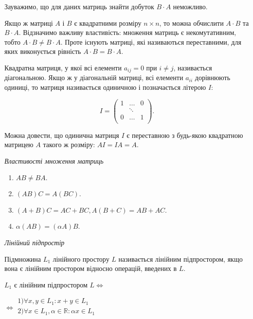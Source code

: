 Зауважимо, що для даних матриць знайти добуток $B \cdot A$ неможливо.

Якщо ж матриці $A$ і $B$ є квадратними розміру $n \times n$, то можна обчислити $A \cdot B$
та $B \cdot A$. Відзначимо важливу властивість: множення матриць є некомутативним,
тобто $A \cdot B \neq B \cdot A$. Проте існують матриці, які називаються переставними, для
яких виконується рівність $A \cdot B = B \cdot A$.

\begin{definition}
	Квадратна матриця, у якої всі елементи $a_{ij} = 0$ при $i \neq j$, називається
	діагональною. Якщо ж у діагональній матриці, всі елементи $a_{ii}$ дорівнюють
	одиниці, то матриця називається одиничною і позначається літерою $I$: 
	
	$$I = \begin{pmatrix}
		1 & ... & 0  \\
		 & \ddots &   \\
		 0 & ... & 1  \\
	\end{pmatrix}.$$
\end{definition}

Можна довести, що одинична матриця $I$ є переставною з будь-якою
квадратною матрицею $A$ такого ж розміру: $A I = I A = A$.

\textit{Властивості множення матриць}
\begin{enumerate}
	\item $AB \neq BA$.
	\item $(AB)C = A(BC)$.
	\item $(A+B)C = AC + BC, A(B+C) = AB + AC$.
	\item $\alpha(AB) = (\alpha A)B$.
\end{enumerate}

\textit{Лінійний підпростір}

\begin{definition}
	Підмножина $L_1$ лінійного простору $L$ називається лінійним
	підпростором, якщо вона є лінійним простором відносно операцій, введених в $L$.
\end{definition}

\begin{claim}
	$L_1$ є лінійним підпростором $L \Leftrightarrow$
	
	$\Leftrightarrow \begin{array}{l}
		1) \forall x, y \in L_1 : x + y \in L_1  \\
		2) \forall x \in L_1, \alpha \in \mathbb{R} : \alpha x \in L_1  \\
	\end{array}$
\end{claim}

